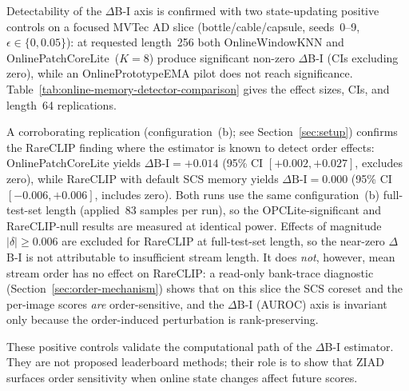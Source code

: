 \documentclass[runningheads]{llncs}
\newcommand{\tabref}[1]{Table~\ref{#1}}
\newcommand{\secref}[1]{Section~\ref{#1}}
\begin{document}
{\sloppy
Detectability of the $\Delta$B-I axis is confirmed with two state-updating
positive controls on a focused MVTec AD slice (bottle/cable/capsule, seeds~0--9,
$\epsilon \in \{0,0.05\}$): at requested length~256 both OnlineWindowKNN and
OnlinePatchCoreLite~($K{=}8$) produce significant non-zero $\Delta$B-I (CIs
excluding zero), while an OnlinePrototypeEMA pilot does not reach significance.
\tabref{tab:online-memory-detector-comparison} gives the effect sizes, CIs, and
length~64 replications.
\par}

\begin{table}[t]
\centering
\small
\caption{State-updating positive controls for validating the $\Delta$B-I
axis on MVTec AD bottle/cable/capsule. OnlineWindowKNN (OWK) and
OnlinePatchCoreLite (OPCLite) use seeds~0--9; PrototypeEMA is a seeds~0--4
pilot. Bold denotes a 95\% CI excluding zero.}
\label{tab:online-memory-detector-comparison}
\resizebox{0.85\textwidth}{!}{}
\end{table}

A corroborating replication (configuration~(b); see \secref{sec:setup})
confirms the RareCLIP finding where the estimator is known to detect order
effects: OnlinePatchCoreLite yields $\Delta\text{B-I} = +0.014$
(95\% CI $[{+0.002},{+0.027}]$, excludes zero), while RareCLIP with default
SCS memory yields $\Delta\text{B-I} = 0.000$
(95\% CI $[{-0.006},{+0.006}]$, includes zero). Both runs use the same
configuration~(b) full-test-set length (applied~83 samples per run), so the
OPCLite-significant and RareCLIP-null results are measured at identical power.
Effects of magnitude $|\delta| \geq 0.006$ are excluded for RareCLIP at
full-test-set length, so the near-zero $\Delta$B-I is not attributable to
insufficient stream length. It does \emph{not}, however, mean stream order has
no effect on RareCLIP: a read-only bank-trace diagnostic
(\secref{sec:order-mechanism}) shows that on this slice the SCS coreset and the
per-image scores \emph{are} order-sensitive, and the $\Delta$B-I (AUROC) axis is
invariant only because the order-induced perturbation is rank-preserving.

These positive controls validate the computational path of the $\Delta$B-I
estimator. They are not proposed leaderboard methods; their role is to show
that ZIAD surfaces order sensitivity when online state changes affect future
scores.
\end{document}
